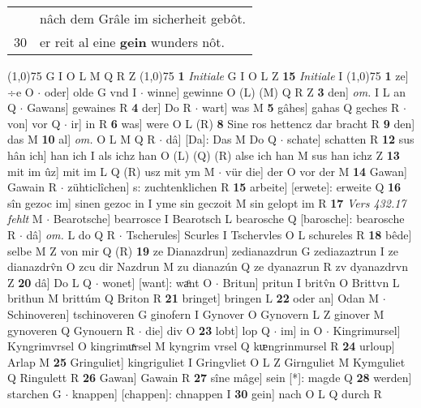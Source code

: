 \documentclass[8pt,a4paper,notitlepage]{article}
\begin{document}
\begin{table}[ht]
\begin{minipage}[t]{0.5\linewidth}
\begin{tabular}{rl}
 & nâch dem Grâle im sicherheit gebôt.\\ 
30 & er reit al eine \textbf{gein} wunders nôt.\\ 
\end{tabular}
\scriptsize
\line(1,0){75} \newline
G I O L M Q R Z \newline
\line(1,0){75} \newline
\textbf{1} \textit{Initiale} G I O L Z  \textbf{15} \textit{Initiale} I  \newline
\line(1,0){75} \newline
\textbf{1} ze] ÷e O  $\cdot$ oder] olde G vnd I  $\cdot$ winne] gewinne O (L) (M) Q R Z \textbf{3} den] \textit{om.} I L an Q  $\cdot$ Gawans] gewaines R \textbf{4} der] Do R  $\cdot$ wart] was M \textbf{5} gâhes] gahas Q geches R  $\cdot$ von] vor Q  $\cdot$ ir] in R \textbf{6} was] were O L (R) \textbf{8} Sine ros hettencz dar bracht R \textbf{9} den] das M \textbf{10} al] \textit{om.} O L M Q R  $\cdot$ dâ] [Da]: Das M Do Q  $\cdot$ schate] schatten R \textbf{12} sus hân ich] han ich I als ichz han O (L) (Q) (R) alse ich han M sus han ichz Z \textbf{13} mit im ûz] mit im L Q (R) usz mit ym M  $\cdot$ vür die] der O vor der M \textbf{14} Gawan] Gawain R  $\cdot$ zühticlîchen] s: zuchtenklichen R \textbf{15} arbeite] [erwete]: erweite Q \textbf{16} sîn gezoc im] sinen gezoc in I yme sin geczoit M sin gelopt im R \textbf{17} \textit{Vers 432.17 fehlt} M   $\cdot$ Bearotsche] bearrosce I Bearotsch L bearosche Q [barosche]: bearosche R  $\cdot$ dâ] \textit{om.} L do Q R  $\cdot$ Tscherules] Scurles I Tschervles O L schureles R \textbf{18} bêde] selbe M Z von mir Q (R) \textbf{19} ze Dianazdrun] zedianazdrun G zediazaztrun I ze dianazdrv̂n O zcu dir Nazdrun M zu dianazún Q ze dyanazrun R zv dyanazdrvn Z \textbf{20} dâ] Do L Q  $\cdot$ wonet] [want]: waͦnt O  $\cdot$ Britun] pritun I britv̂n O Brittvn L brithun M brittúm Q Briton R \textbf{21} bringet] bringen L \textbf{22} oder an] Odan M  $\cdot$ Schinoveren] tschinoveren G ginofern I Gynover O Gynovern L Z ginover M gynoveren Q Gynouern R  $\cdot$ die] div O \textbf{23} lobt] lop Q  $\cdot$ im] in O  $\cdot$ Kingrimursel] Kyngrimvrsel O kingrimuͯrsel M kyngrim vrsel Q kᵫngrinmursel R \textbf{24} urloup] Arlap M \textbf{25} Gringuliet] kingriguliet I Gringvliet O L Z Girnguliet M Kymguliet Q Ringulett R \textbf{26} Gawan] Gawain R \textbf{27} sîne mâge] sein [*]: magde Q \textbf{28} werden] starchen G  $\cdot$ knappen] [chappen]: chnappen I \textbf{30} gein] nach O L Q durch R \newline

\end{minipage}
\end{table}
\end{document}
